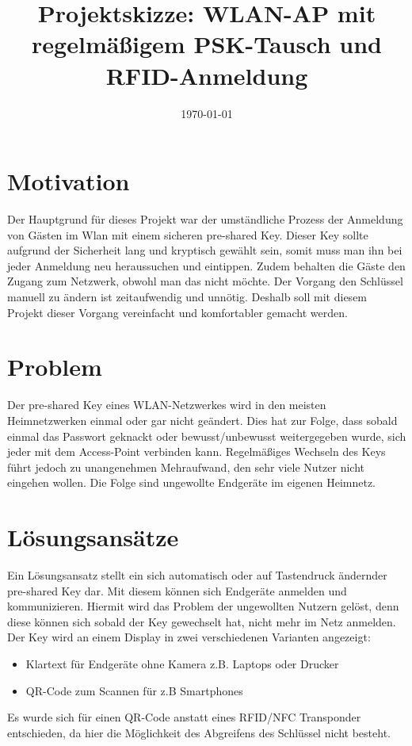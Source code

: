 \documentclass[a4paper,11pt,singlespacing]{article}
\title{Projektskizze: WLAN-AP mit regelmäßigem PSK-Tausch und RFID-Anmeldung}
\date{\today}
\begin{document}
	\setlength{\parindent}{0ex}
	
	\maketitle
	
	\section{Motivation}
	Der Hauptgrund für dieses Projekt war der umständliche Prozess der Anmeldung von Gästen im Wlan mit einem sicheren pre-shared Key. Dieser Key sollte aufgrund der Sicherheit lang und kryptisch gewählt sein, somit muss man ihn bei jeder Anmeldung neu heraussuchen und eintippen. Zudem behalten die Gäste den Zugang zum Netzwerk, obwohl man das nicht möchte. Der Vorgang den Schlüssel manuell zu ändern ist zeitaufwendig und unnötig. Deshalb soll mit diesem Projekt dieser Vorgang vereinfacht und komfortabler gemacht werden. 
	
	\section{Problem}
	Der pre-shared Key eines WLAN-Netzwerkes wird in den meisten Heimnetzwerken einmal oder gar nicht geändert. Dies hat zur Folge, dass sobald einmal das Passwort geknackt oder bewusst/unbewusst weitergegeben wurde, sich jeder mit dem Access-Point verbinden kann. Regelmäßiges Wechseln des Keys führt jedoch zu unangenehmen Mehraufwand, den sehr viele Nutzer nicht eingehen wollen. Die Folge sind ungewollte Endgeräte im eigenen Heimnetz.

	\section{Lösungsansätze}
	Ein Lösungsansatz stellt ein sich automatisch oder auf Tastendruck ändernder pre-shared Key dar. Mit diesem können sich Endgeräte anmelden und kommunizieren. Hiermit wird das Problem der ungewollten Nutzern gelöst, denn diese können sich sobald der Key gewechselt hat, nicht mehr im Netz anmelden. Der Key wird an einem Display in zwei verschiedenen Varianten angezeigt:
	\begin{itemize}
		\item Klartext für Endgeräte ohne Kamera z.B. Laptops oder Drucker
		\item QR-Code zum Scannen für z.B Smartphones
	\end{itemize}
	Es wurde sich für einen QR-Code anstatt eines RFID/NFC Transponder entschieden, da hier die Möglichkeit des Abgreifens des Schlüssel nicht besteht. 
\end{document}
